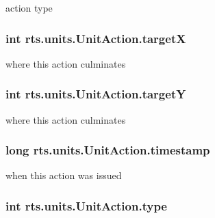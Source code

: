 \label{classrts_1_1units_1_1_unit_action_af700ddb351f336079eda218ec47a9e92}
action type \hypertarget{classrts_1_1units_1_1_unit_action_a186f77304bc2af95767e71d46bcc0d37}{
\subsubsection[{targetX}]{\setlength{\rightskip}{0pt plus 5cm}int {\bf rts.units.UnitAction.targetX}}}
\label{classrts_1_1units_1_1_unit_action_a186f77304bc2af95767e71d46bcc0d37}
where this action culminates \hypertarget{classrts_1_1units_1_1_unit_action_a2cca81f6237c185071a5e45795da93bd}{
\subsubsection[{targetY}]{\setlength{\rightskip}{0pt plus 5cm}int {\bf rts.units.UnitAction.targetY}}}
\label{classrts_1_1units_1_1_unit_action_a2cca81f6237c185071a5e45795da93bd}
where this action culminates \hypertarget{classrts_1_1units_1_1_unit_action_ab2f5314049fc69ab11801c3133193246}{
\subsubsection[{timestamp}]{\setlength{\rightskip}{0pt plus 5cm}long {\bf rts.units.UnitAction.timestamp}}}
\label{classrts_1_1units_1_1_unit_action_ab2f5314049fc69ab11801c3133193246}
when this action was issued \hypertarget{classrts_1_1units_1_1_unit_action_a17c35f7f6e20e9ddaf0beef22033ba16}{
\subsubsection[{type}]{\setlength{\rightskip}{0pt plus 5cm}int {\bf rts.units.UnitAction.type}}}
